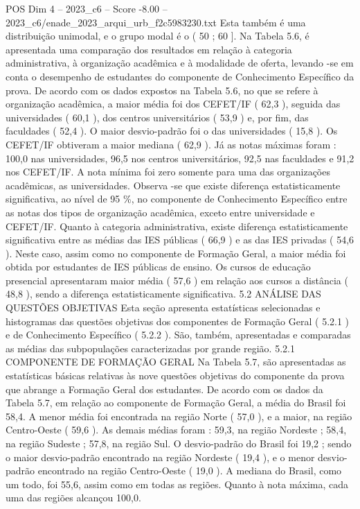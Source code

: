 \begin{textsample}{POS Dim 4 – 2023\_c6 – Score -8.00 – 2023\_c6/enade\_2023\_arqui\_urb\_f2c5983230.txt}
Esta também é uma distribuição unimodal, e o grupo modal é o ( 50 ; 60 ].
Na Tabela 5.6, é apresentada uma comparação dos resultados em relação à categoria administrativa, à organização acadêmica e à modalidade de oferta, levando -se em conta o desempenho de estudantes do componente de Conhecimento Específico da prova.
De acordo com os dados expostos na Tabela 5.6, no que se refere à organização acadêmica, a maior média foi dos CEFET/IF ( 62,3 ), seguida das universidades ( 60,1 ), dos centros universitários ( 53,9 ) e, por fim, das faculdades ( 52,4 ).
O maior desvio-padrão foi o das universidades ( 15,8 ).
Os CEFET/IF obtiveram a maior mediana ( 62,9 ).
Já as notas máximas foram : 100,0 nas universidades, 96,5 nos centros universitários, 92,5 nas faculdades e 91,2 nos CEFET/IF.
A nota mínima foi zero somente para uma das organizações acadêmicas, as universidades.
Observa -se que existe diferença estatisticamente significativa, ao nível de 95 \%, no componente de Conhecimento Específico entre as notas dos tipos de organização acadêmica, exceto entre universidade e CEFET/IF.
Quanto à categoria administrativa, existe diferença estatisticamente significativa entre as médias das IES públicas ( 66,9 ) e as das IES privadas ( 54,6 ).
Neste caso, assim como no componente de Formação Geral, a maior média foi obtida por estudantes de IES públicas de ensino.
Os cursos de educação presencial apresentaram maior média ( 57,6 ) em relação aos cursos a distância ( 48,8 ), sendo a diferença estatisticamente significativa. 5.2 ANÁLISE DAS QUESTÕES OBJETIVAS Esta seção apresenta estatísticas selecionadas e histogramas das questões objetivas dos componentes de Formação Geral ( 5.2.1 ) e de Conhecimento Específico ( 5.2.2 ).
São, também, apresentadas e comparadas as médias das subpopulações caracterizadas por grande região. 5.2.1 COMPONENTE DE FORMAÇÃO GERAL Na Tabela 5.7, são apresentadas as estatísticas básicas relativas às nove questões objetivas do componente da prova que abrange a Formação Geral dos estudantes.
De acordo com os dados da Tabela 5.7, em relação ao componente de Formação Geral, a média do Brasil foi 58,4.
A menor média foi encontrada na região Norte ( 57,0 ), e a maior, na região Centro-Oeste ( 59,6 ).
As demais médias foram : 59,3, na região Nordeste ; 58,4, na região Sudeste ; 57,8, na região Sul.
O desvio-padrão do Brasil foi 19,2 ; sendo o maior desvio-padrão encontrado na região Nordeste ( 19,4 ), e o menor desvio-padrão encontrado na região Centro-Oeste ( 19,0 ).
A mediana do Brasil, como um todo, foi 55,6, assim como em todas as regiões.
Quanto à nota máxima, cada uma das regiões alcançou 100,0.

\end{textsample}
